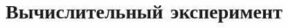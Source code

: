 \documentclass[12pt, fleqn, unicode]{article}
\newcommand{\bY}{\mathbf{Y}}
\newcommand{\bX}{\mathbf{X}}
\newcommand{\bu}{\mathbf{u}}
\newcommand{\bt}{\mathbf{t}}
\newcommand{\bP}{\mathbf{P}}
\newcommand{\bT}{\mathbf{T}}
\newcommand{\bQ}{\mathbf{Q}}
\newcommand{\bE}{\mathbf{E}}
\newcommand{\bF}{\mathbf{F}}
\newcommand{\bU}{\mathbf{U}}
\newcommand{\bchi}{\boldsymbol{\chi}}
\newcommand{\bTheta}{\boldsymbol{\Theta}}
\newcommand{\T}{^{\text{\tiny\sffamily\upshape\mdseries T}}}
\renewcommand{\T}{\intercal}
\begin{document}
\section{Вычислительный эксперимент}





\end{document}
